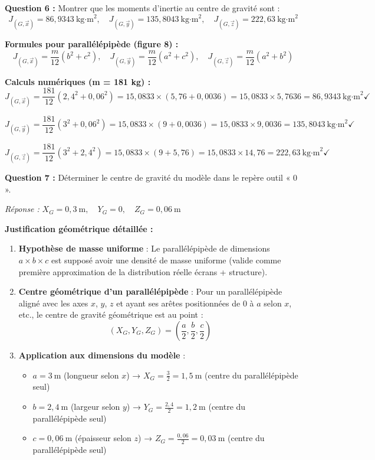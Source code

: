 \documentclass[12pt,a4paper,twoside]{article}
\begin{document}
\begin{correction}
  \textbf{Question 6 :} Montrer que les moments d'inertie au centre de gravité sont :
  \[
    J_{(G,\vec{x})} = 86,9343~\text{kg·m}^2, \quad
    J_{(G,\vec{y})} = 135,8043~\text{kg·m}^2, \quad
    J_{(G,\vec{z})} = 222,63~\text{kg·m}^2
  \]

  \textbf{Formules pour parallélépipède (figure 8) :}
  \[
    J_{(G,\vec{x})} = \frac{m}{12}(b^2 + c^2), \quad
    J_{(G,\vec{y})} = \frac{m}{12}(a^2 + c^2), \quad
    J_{(G,\vec{z})} = \frac{m}{12}(a^2 + b^2)
  \]

  \textbf{Calculs numériques (m = 181 kg) :}
  \[
    J_{(G,\vec{x})} = \frac{181}{12}(2,4^2 + 0,06^2) = 15,0833 \times (5,76 + 0,0036) = 15,0833 \times 5,7636 = 86,9343~\text{kg·m}^2 \checkmark
  \]

  \[
    J_{(G,\vec{y})} = \frac{181}{12}(3^2 + 0,06^2) = 15,0833 \times (9 + 0,0036) = 15,0833 \times 9,0036 = 135,8043~\text{kg·m}^2 \checkmark
  \]

  \[
    J_{(G,\vec{z})} = \frac{181}{12}(3^2 + 2,4^2) = 15,0833 \times (9 + 5,76) = 15,0833 \times 14,76 = 222,63~\text{kg·m}^2 \checkmark
  \]

  \textbf{Question 7 :} Déterminer le centre de gravité du modèle dans le repère outil « 0 ».

  \textit{Réponse :} $\boxed{X_G = 0,3~\text{m}, \quad Y_G = 0, \quad Z_G = 0,06~\text{m}}$

  \textbf{Justification géométrique détaillée :}

  \begin{enumerate}
    \item \textbf{Hypothèse de masse uniforme} : Le parallélépipède de dimensions $a \times b \times c$ est supposé avoir une densité de masse uniforme (valide comme première approximation de la distribution réelle écrans + structure).

    \item \textbf{Centre géométrique d'un parallélépipède} : Pour un parallélépipède aligné avec les axes $x$, $y$, $z$ et ayant ses arêtes positionnées de $0$ à $a$ selon $x$, etc., le centre de gravité géométrique est au point :
    \[
      (X_G, Y_G, Z_G) = \left( \frac{a}{2}, \frac{b}{2}, \frac{c}{2} \right)
    \]

    \item \textbf{Application aux dimensions du modèle} :
    \begin{itemize}
      \item $a = 3~\text{m}$ (longueur selon $x$) → $X_G = \frac{3}{2} = 1,5~\text{m}$ (centre du parallélépipède seul)
      \item $b = 2,4~\text{m}$ (largeur selon $y$) → $Y_G = \frac{2,4}{2} = 1,2~\text{m}$ (centre du parallélépipède seul)
      \item $c = 0,06~\text{m}$ (épaisseur selon $z$) → $Z_G = \frac{0,06}{2} = 0,03~\text{m}$ (centre du parallélépipède seul)
    \end{itemize}


\end{enumerate}
\end{correction}
\end{document}
